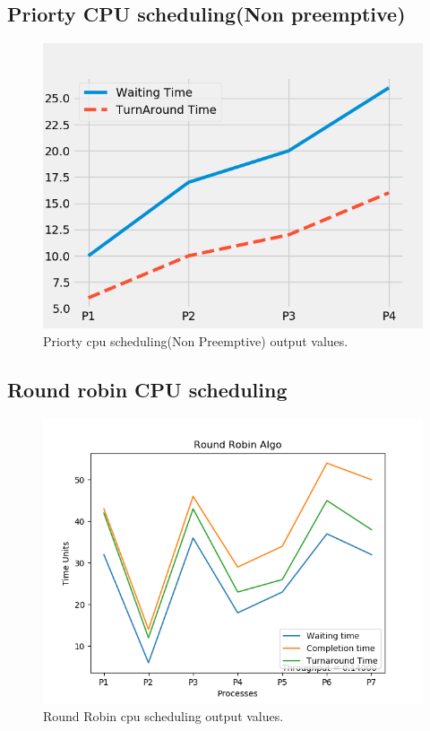 \documentclass[11pt,a4paper]{report}
\begin{document}
{		\subsection*{Priorty CPU scheduling(Non preemptive)}
		{\begin{figure}[H]
		    \centering
		    \includegraphics[scale=0.75]{PRIORITY_P_output.png}
		    \caption{Priorty cpu scheduling(Non Preemptive) output values.}
		\end{figure}}
		\subsection*{Round robin CPU scheduling}
		{\begin{figure}[H]
		    \centering
		    \includegraphics[scale=1]{ROUND_ROBIN_output.png}
		    \caption{Round Robin cpu scheduling output values.}
		\end{figure}}
		}
		\vskip 14cm
\end{document}
